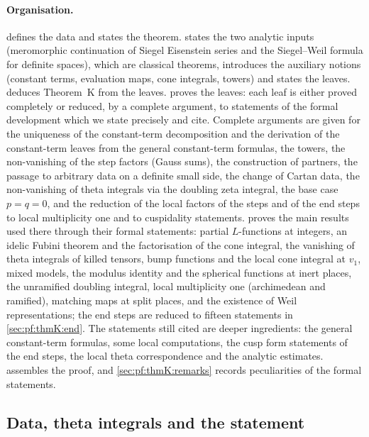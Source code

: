 \paragraph{Organisation.}
 defines the data and states the theorem.  states the two analytic
inputs (meromorphic continuation of Siegel Eisenstein series and the Siegel--Weil formula for definite spaces), which are
classical theorems, introduces the auxiliary notions (constant terms, evaluation maps, cone integrals, towers) and states
the leaves.  deduces Theorem~K from the leaves.  proves the
leaves: each leaf is either proved completely or reduced, by a complete argument, to statements of the formal development
\cite{LeanSource2026} which we state precisely and cite. Complete arguments are given for the uniqueness of the
constant-term decomposition and the derivation of the constant-term leaves from the general constant-term formulas, the
towers, the non-vanishing of the step factors (Gauss sums), the construction of partners, the passage to arbitrary data on
a definite small side, the change of Cartan data, the non-vanishing of theta integrals via the doubling zeta integral, the
base case $p=q=0$, and the reduction of the local factors of the steps and of the end steps to local multiplicity one and
to cuspidality statements.  proves the main results used there through their formal statements:
partial $L$-functions at integers, an idelic Fubini theorem and the factorisation of the cone integral, the vanishing of
theta integrals of killed tensors, bump functions and the local cone integral at $v_1$, mixed models, the modulus identity and
the spherical functions at inert places, the unramified doubling integral, local multiplicity one (archimedean and
ramified), matching maps at split places, and the existence of Weil representations; the end steps are reduced to fifteen
statements in \cref{sec:pf:thmK:end}. The statements still cited are deeper ingredients: the general constant-term formulas,
some local computations, the cusp form statements of the end steps, the local theta correspondence and the analytic
estimates.  assembles the proof, and
\cref{sec:pf:thmK:remarks} records peculiarities of the formal statements.

\subsection{Data, theta integrals and the statement}\label{sec:pf:thmK:setting}

